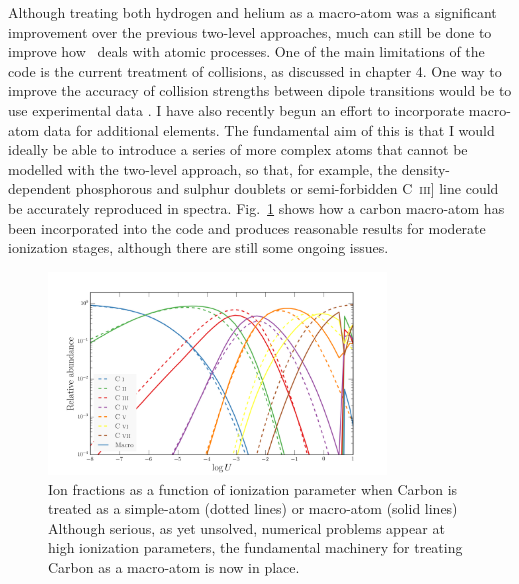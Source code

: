 Although treating both hydrogen and helium as a macro-atom was
a significant improvement over the previous two-level approaches, 
much can still be done to improve how \py\ deals with atomic processes.
One of the main limitations of the code is the current treatment of
collisions, as discussed in chapter 4. One way to improve the accuracy
of collision strengths between dipole transitions would be to use
experimental data \citep[e.g.][]{gaetz1983}. 
I have also recently begun an effort to incorporate macro-atom data for
additional elements. The fundamental aim of this is that I would ideally
be able to introduce a series of more complex atoms that cannot be modelled 
with the two-level approach, so that, for example, the density-dependent 
phosphorous and sulphur doublets or semi-forbidden C~\textsc{iii}] 
line could be accurately reproduced in spectra. 
Fig.~\ref{fig:carbon_matom} shows how a carbon macro-atom
has been incorporated into the code and produces reasonable results for moderate
ionization stages, although there are still some ongoing issues.

\begin{figure} 
\centering
\includegraphics[width=0.8\textwidth]{figures/ewpaper/carbon_matom_ion.png}
\caption
{
Ion fractions as a function of ionization parameter when 
Carbon is treated as a simple-atom (dotted lines) or macro-atom (solid lines)
Although serious, as yet unsolved, numerical problems appear at 
high ionization parameters, the fundamental machinery for treating
Carbon as a macro-atom is now in place.
}
\label{fig:carbon_matom}
\end{figure} 


